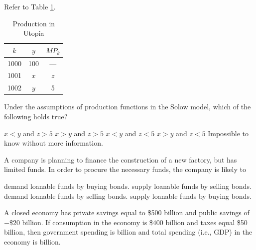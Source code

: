 \documentclass[addpoints,11pt]{exam}
\theoremstyle{definition}
\newcommand{\blank}[0]{\underline{\hspace{3cm}}}
\begin{document}
\begin{questions}
\begin{choices}
\end{choices}

\newpage


\question Refer to Table \ref{tab3}. 

\begin{table}[H]
	\centering
	\caption{Production in Utopia}
	\label{tab3}
	\begin{tabular}{c|c|c}        
		
		$k$ & $y$ & $MP_k$ \\
		\hline
		1000 & 100 & --- \\
		1001 & $x$ & $z$ \\
		1002 & $y$ & 5 \\
		
	\end{tabular}
\end{table}

Under the assumptions of production functions in the Solow model, which of the following holds true?

\begin{choices}
	\CorrectChoice $x<y$ and $z>5$
	\choice $x>y$ and $z>5$
	\choice $x<y$ and $z<5$
	\choice $x>y$ and $z<5$
	\choice Impossible to know without more information.
\end{choices}



	
\question A company is planning to finance the construction of a new factory, but has limited funds. In order to procure the necessary funds, the company is likely to 

\begin{choices}
	\choice demand loanable funds by buying bonds.
	\choice supply loanable funds by selling bonds.
	\CorrectChoice demand loanable funds by selling bonds.
	\choice supply loanable funds by buying bonds.
\end{choices}

\question A closed economy has private savings equal to \$500 billion and public savings of $-\$20$ billion. If consumption in the economy is \$400 billion and taxes equal \$50 billion, then government spending is \blank billion and total spending (i.e., GDP) in the economy is \blank billion.


\end{questions}
\end{document}
